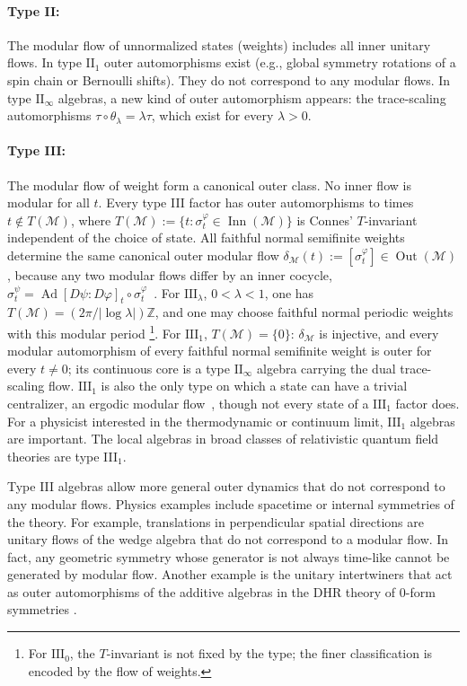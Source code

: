 \documentclass[a4paper,11pt]{article}
\theoremstyle{definition}
\newcommand{\mM}{\mathcal{M}}
\begin{document}
\paragraph{Type II:} The modular flow of unnormalized states (weights) includes all inner unitary flows. 
In type $\mathrm{II}_1$ outer automorphisms exist (e.g., global symmetry rotations of a spin chain or Bernoulli shifts). They do not correspond to any modular flows.
In type $\mathrm{II}_\infty$ algebras, a new kind of outer automorphism appears: the trace-scaling automorphisms $\tau\circ\theta_\lambda=\lambda\tau$, which exist for every $\lambda>0$.

\paragraph{Type III:} The modular flow of weight form a canonical outer class.
No inner flow is modular for all $t$. Every type III factor has outer automorphisms to times $t\notin T(\mM)$, where $T(\mM):=\{t:\sigma^\varphi_t\in\operatorname{Inn}(\mM)\}$ is Connes' $T$-invariant independent of the choice of state. All faithful normal semifinite weights determine the same canonical outer modular flow $\delta_{\mM}(t):=[\sigma^\varphi_t]\in\operatorname{Out}(\mM)$, because any two modular flows differ by an inner cocycle, $\sigma^\psi_t=\operatorname{Ad}[D\psi:D\varphi]_t\circ\sigma^\varphi_t$~\cite{Connes1973,ConnesTakesaki1977}. For $\mathrm{III}_\lambda$, $0<\lambda<1$, one has $T(\mM)=(2\pi/|\log\lambda|)\mathbb Z$, and one may choose faithful normal periodic weights with this modular period \footnote{For $\mathrm{III}_0$, the $T$-invariant is not fixed by the type; the finer classification is encoded by the flow of weights.}. For $\mathrm{III}_1$, $T(\mM)=\{0\}$: $\delta_{\mM}$ is injective, and every modular automorphism of every faithful normal semifinite weight is outer for every $t\ne0$; its continuous core is a type $\mathrm{II}_\infty$ algebra carrying the dual trace-scaling flow. $\mathrm{III}_1$ is also the only type on which a state can have a trivial centralizer, an ergodic modular flow~\cite{Connes1973,Longo1982}, though not every state of a $\mathrm{III}_1$ factor does. For a physicist interested in the thermodynamic or continuum limit, $\mathrm{III}_1$ algebras are important. The local algebras in broad classes of relativistic quantum field theories are type III$_1$. 
    
    Type III algebras allow more general outer dynamics that do not correspond to any modular flows. Physics examples include spacetime or internal symmetries of the theory. For example, translations in perpendicular spatial directions are unitary flows of the wedge algebra that do not correspond to a modular flow. In fact, any geometric symmetry whose generator is not always time-like cannot be generated by modular flow. Another example is the unitary intertwiners that act as outer automorphisms of the additive algebras in the DHR theory of $0$-form symmetries \cite{casini2020entanglement}. 
\end{document}
